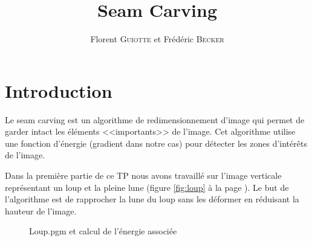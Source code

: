 \documentclass{article}
\author{Florent \textsc{Guiotte} et Frédéric \textsc{Becker}}
\title{Seam Carving}
\begin{document}
\maketitle
\tableofcontents

\section{Introduction}

Le seam carving est un algorithme de redimensionnement d'image qui permet de garder intact les éléments <<importants>>
de l'image. Cet algorithme utilise une fonction d'énergie (gradient dans notre cas) pour détecter les zones d'intérêts
de l'image.

Dans la première partie de ce TP nous avons travaillé sur l'image verticale 
représentant un loup et la pleine lune (figure \ref{fig:loup}  à la page \pageref{fig:loup}).
Le but de l'algorithme est de rapprocher la lune du loup sans les déformer en réduisant la hauteur de l'image.

\begin{figure}[!ht]%
  \centering
  \hspace{0.030\textwidth}
  \caption{Loup.pgm et calcul de l'énergie associée}
  \label{fig:init}
\end{figure}
\end{document}
